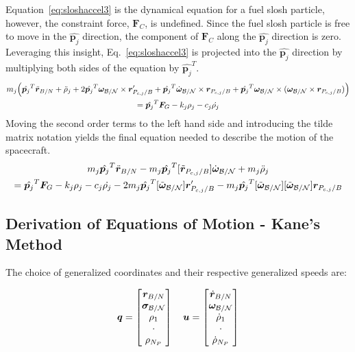 Equation~\eqref{eq:sloshaccel3} is the dynamical equation for a fuel slosh particle, however, the constraint force, $\bm F_C$, is undefined. Since the fuel slosh particle is free to move in the $\hat{\bm p_j}$ direction, the component of $\bm F_C$ along the $\hat{\bm p_j}$ direction is zero. Leveraging this insight, Eq.~\eqref{eq:sloshaccel3} is projected into the $\hat{\bm p_j}$ direction by multiplying both sides of the equation by $\hat{\bm p_j}^T$.
\begin{multline}
	m_j \Bigl(\hat{\bm p_j}^T \ddot{\bm{r}}_{B/N} + \ddot{\rho}_j  +2 \hat{\bm p_j}^T  \bm\omega_{\cal B/N} \times \bm{r}'_{P_{c,j}/B} + \hat{\bm p_j}^T \dot{\bm\omega}_{\cal B/N} \times \bm{r}_{P_{c,j}/B}  + \hat{\bm p_j}^T \bm\omega_{\cal B/N} \times (\bm\omega_{\cal B/N} \times \bm{r}_{P_{c,j}/B})\Bigr)\\
	= \hat{\bm p_j}^T \bm F_G - k_j \rho_j - c_j \dot{\rho_j}
	\label{eq:sloshaccel4}
\end{multline}	
Moving the second order terms to the left hand side and introducing the tilde matrix notation yields the final equation needed to describe the motion of the spacecraft.
\begin{multline}
	m_j \hat{\bm p_j}^T \ddot{\bm{r}}_{B/N} - m_j \hat{\bm p_j}^T [\tilde{\bm{r}}_{P_{c,j}/B}] \dot{\bm\omega}_{\cal B/N} + m_j \ddot{\rho}_j  \\
	= \hat{\bm p_j}^T \bm F_G - k_j \rho_j - c_j \dot{\rho_j} - 2 m_j \hat{\bm p_j}^T  [\tilde{\bm\omega}_{\cal B/N}] \bm{r}'_{P_{c,j}/B}  - m_j \hat{\bm p_j}^T [\tilde{\bm\omega}_{\cal B/N}] [\tilde{\bm\omega}_{\cal B/N}] \bm{r}_{P_{c,j}/B} 
	\label{eq:sloshaccel5}
\end{multline}	

\subsection{Derivation of Equations of Motion - Kane's Method}

The choice of generalized coordinates and their respective generalized speeds are:

\begin{equation}
	\bm q = 
	\begin{bmatrix}
		\bm r_{B/N}\\
		\bm \sigma_{\cal{B/N}}\\
		\rho_1\\
		\cdot\\
		\rho_{N_P}
	\end{bmatrix}
	\quad
	\bm u = \begin{bmatrix}
		\dot{\bm r}_{B/N}\\
		\bm \omega_{\cal{B/N}}\\
		\dot{\rho}_1\\
		\cdot\\
		\dot{\rho}_{N_P}
	\end{bmatrix}
\end{equation} 

